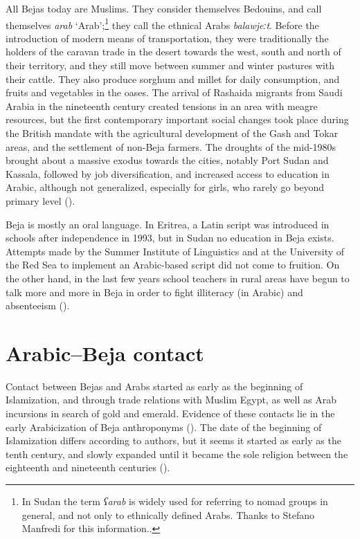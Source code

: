 \documentclass[output=paper]{langsci/langscibook}
\begin{document}
All Bejas today are Muslims. They consider themselves Bedouins, and call themselves \textit{arab} ‘Arab’;\footnote{In Sudan the term \textit{ʕarab} is widely used for referring to nomad groups in general, and not only to ethnically defined Arabs. Thanks to Stefano Manfredi for this information..} they call the ethnical Arabs \textit{balawjeːt}. Before the introduction of modern means of transportation, they were traditionally the holders of the caravan trade in the desert towards the west, south and north of their territory, and they still move between summer and winter pastures with their cattle. They also produce sorghum and millet for daily consumption, and fruits and vegetables in the oases. The arrival of Rashaida migrants from Saudi Arabia in the nineteenth century created tensions in an area with meagre resources, but the first contemporary important social changes took place during the British mandate with the agricultural development of the Gash and Tokar areas, and the settlement of non-Beja farmers. The droughts of the mid-1980s brought about a massive exodus towards the cities, notably Port Sudan and Kassala, followed by job diversification, and increased access to education in Arabic, although not generalized, especially for girls, who rarely go beyond primary level (\citealt{HamidAhmed2005book}).

Beja is mostly an oral language. In Eritrea, a Latin script was introduced in schools after independence in 1993, but in Sudan no education in Beja exists. Attempts made by the Summer Institute of Linguistics and at the University of the Red Sea to implement an Arabic-based script did not come to fruition. On the other hand, in the last few years school teachers in rural areas have begun to talk more and more in Beja in order to fight illiteracy (in Arabic) and absenteeism (\citealt{Onour2015}).

\section{Arabic--Beja contact}

Contact between Bejas and Arabs started as early as the beginning of Islamization, and through trade relations with Muslim Egypt, as well as Arab incursions in search of gold and emerald. Evidence of these contacts lie in the early Arabicization of Beja anthroponyms (\citealt{Záhořík2007}). The date of the beginning of Islamization differs according to authors, but it seems it started as early as the tenth century, and slowly expanded until it became the sole religion between the eighteenth and nineteenth centuries (\citealt{Záhořík2007}).
\end{document}
